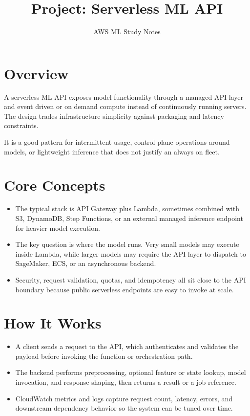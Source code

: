\documentclass[10pt,twocolumn]{article}
\begin{document}
\title{\vspace{-1.6cm}Project: Serverless ML API}
\author{AWS ML Study Notes}
\date{}
\maketitle
\small

\section*{Overview}
A serverless ML API exposes model functionality through a managed API layer and event driven or on demand compute instead of continuously running servers. The design trades infrastructure simplicity against packaging and latency constraints.

It is a good pattern for intermittent usage, control plane operations around models, or lightweight inference that does not justify an always on fleet.

\section*{Core Concepts}
\begin{itemize}
\item The typical stack is API Gateway plus Lambda, sometimes combined with S3, DynamoDB, Step Functions, or an external managed inference endpoint for heavier model execution.
\item The key question is where the model runs. Very small models may execute inside Lambda, while larger models may require the API layer to dispatch to SageMaker, ECS, or an asynchronous backend.
\item Security, request validation, quotas, and idempotency all sit close to the API boundary because public serverless endpoints are easy to invoke at scale.
\end{itemize}

\section*{How It Works}
\begin{itemize}
\item A client sends a request to the API, which authenticates and validates the payload before invoking the function or orchestration path.
\item The backend performs preprocessing, optional feature or state lookup, model invocation, and response shaping, then returns a result or a job reference.
\item CloudWatch metrics and logs capture request count, latency, errors, and downstream dependency behavior so the system can be tuned over time.
\end{itemize}
\end{document}
